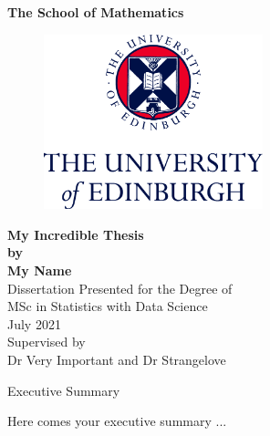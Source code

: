 \documentclass[11pt,twoside]{article}
\numberwithin{Theorem}{section}
\numberwithin{Definition}{section}
\numberwithin{Lemma}{section}
\numberwithin{Algorithm}{section}
\numberwithin{equation}{section}
\begin{document}
\pagestyle{empty}

\begin{titlepage}
\vspace*{.5em}
\center
\textbf{\Large{The School of Mathematics}} \\
\vspace*{1em}
\begin{figure}[!h]
\centering
\includegraphics[width=180pt]{CentredLogoCMYK.jpg}
\end{figure}
\vspace{2em}
\textbf{\Huge{My Incredible Thesis}}\\[2em]
\textbf{\LARGE{by}}\\
\vspace{2em}
\textbf{\LARGE{My Name}}\\
\vspace{6.5em}
\Large{Dissertation Presented for the Degree of\\
MSc in Statistics with Data Science}\\
\vspace{6.5em}
\Large{July 2021}\\
\vspace{3em}
\Large{Supervised by\\Dr Very Important and Dr Strangelove}
\vfill
\end{titlepage}

\cleardoublepage

\begin{center}
\Large{Executive Summary}
\end{center}

Here comes your executive summary ...
\end{document}
